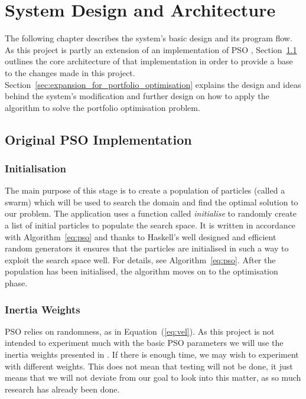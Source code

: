 \chapter{System Design and Architecture}\label{chap:design}
The following chapter describes the system's basic design and its program flow. As this project is partly an extension of an implementation of PSO \cite{haskellPSO}, Section~\ref{sec:original_pso_implementation} outlines the core architecture of that implementation in order to provide a base to the changes made in this project. Section~\ref{sec:expansion_for_portfolio_optimisation} explains the design and ideas behind the system's modification and further design on how to apply the algorithm to solve the portfolio optimisation problem.

  \section{Original PSO Implementation} %
  \label{sec:original_pso_implementation}
    \subsection{Initialisation} %
    \label{sub:initialisation}
    The main purpose of this stage is to create a population of particles (called a swarm) which will be used to search the domain and find the optimal solution to our problem. The application uses a function called \textit{initialise} to randomly create a list of initial particles to populate the search space. It is written in accordance with Algorithm~\ref{eq:pso} and thanks to Haskell's well designed and efficient random generators \cite{random} it ensures that the particles are initialised in such a way to exploit the search space well. For details, see Algorithm~\ref{eq:pso}. After the population has been initialised, the algorithm moves on to the optimisation phase.
    \subsection{Inertia Weights} %
    \label{sub:inertia_weights}
    PSO relies on randomness, as in Equation~(\ref{eq:vel}). As this project is not intended to experiment much with the basic PSO parameters we will use the inertia weights presented in \cite{constriction_factor_3}. If there is enough time, we may wish to experiment with different weights. This does not mean that testing will not be done, it just means that we will not deviate from our goal to look into this matter, as so much research has already been done\cite{inertia}.

